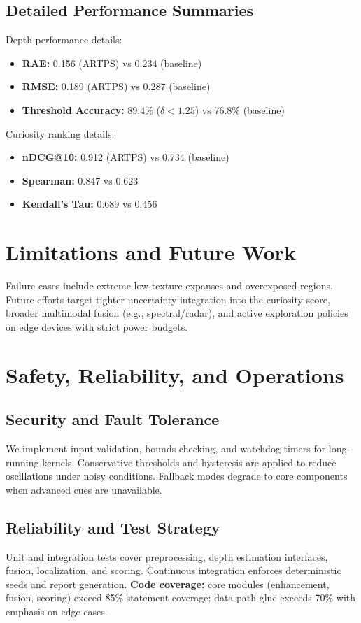 \documentclass[12pt]{article}
\begin{document}
\subsection{Detailed Performance Summaries}
Depth performance details:
\begin{itemize}
\item \textbf{RAE:} 0.156 (ARTPS) vs 0.234 (baseline)
\item \textbf{RMSE:} 0.189 (ARTPS) vs 0.287 (baseline)
\item \textbf{Threshold Accuracy:} 89.4\% ($\delta<1.25$) vs 76.8\% (baseline)
\end{itemize}
Curiosity ranking details:
\begin{itemize}
\item \textbf{nDCG@10:} 0.912 (ARTPS) vs 0.734 (baseline)
\item \textbf{Spearman:} 0.847 vs 0.623
\item \textbf{Kendall's Tau:} 0.689 vs 0.456
\end{itemize}

\section{Limitations and Future Work}
Failure cases include extreme low-texture expanses and overexposed regions. Future efforts target tighter uncertainty integration into the curiosity score, broader multimodal fusion (e.g., spectral/radar), and active exploration policies on edge devices with strict power budgets.

\section{Safety, Reliability, and Operations}
\subsection{Security and Fault Tolerance}
We implement input validation, bounds checking, and watchdog timers for long-running kernels. Conservative thresholds and hysteresis are applied to reduce oscillations under noisy conditions. Fallback modes degrade to core components when advanced cues are unavailable.

\subsection{Reliability and Test Strategy}
Unit and integration tests cover preprocessing, depth estimation interfaces, fusion, localization, and scoring. Continuous integration enforces deterministic seeds and report generation. \textbf{Code coverage:} core modules (enhancement, fusion, scoring) exceed 85\% statement coverage; data-path glue exceeds 70\% with emphasis on edge cases.
\end{document}
